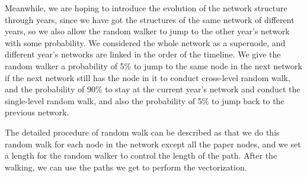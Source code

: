 \documentclass{acmtog} %
\begin{document}
\par Meanwhile, we are hoping to introduce the evolution of the network structure through years, since we have got the structures of the same network of different years, so we also allow the random walker to jump to the other year's network with some probability. We considered the whole network as a supernode, and different year's networks are linked in the order of the timeline. We give the random walker a probability of 5\% to jump to the same node in the next network if the next network still has the node in it to conduct cross-level random walk, and the probability of 90\% to stay at the current year's network and conduct the single-level random walk, and also the probability of 5\% to jump back to the previous network.
\par The detailed procedure of random walk can be described as that we do this random walk for each node in the network except all the paper nodes, and we set a length for the random walker to control the length of the path. After the walking, we can use the paths we get to perform the vectorization.
\end{document}
